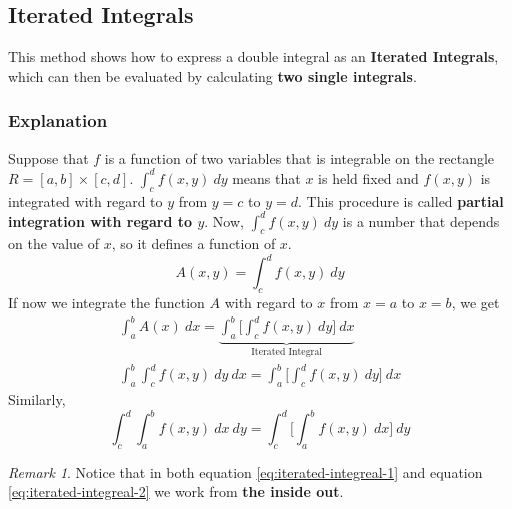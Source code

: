 \documentclass[math,code]{amznotes}
\theoremstyle{remark}
\newtheorem*{remark}{Remark}
\begin{document}
\subsection{Iterated Integrals}
This method shows how to express a double integral as an {\color{red} \textbf{Iterated Integrals}}, which can then be evaluated by calculating \textbf{two single integrals}.
\subsubsection{Explanation}
Suppose that $f$ is a function of two variables that is integrable on the rectangle $R=[a,b]\times[c,d]$. $\int_{c}^{d}f(x,y)~dy$ means that $x$ is held fixed and $f(x,y)$ is integrated with regard to $y$ from $y=c$ to $y=d$. This procedure is called {\color{red} \textbf{partial integration with regard to $y$}}. Now, $\int_{c}^{d}f(x,y)~dy$ is a number that depends on the value of $x$, so it defines a function of $x$.
\begin{displaymath}
    A(x,y)=\int_{c}^{d}f(x,y)~dy
\end{displaymath}
If now we integrate the function $A$ with regard to $x$ from $x=a$ to $x=b$, we get
\begin{gather}
    \int_a^bA(x)~dx=\underbrace{\int_a^b\Bigg[\int_c^df(x,y)~dy\Bigg]~dx}_\text{Iterated Integral} \\
    \int_a^b\int_c^df(x,y)~dy~dx = \int_a^b\Bigg[\int_c^df(x,y)~dy\Bigg]~dx \label{eq:iterated-integreal-1}
\end{gather}
Similarly,
\begin{equation} \label{eq:iterated-integreal-2}
    \int_c^d\int_a^bf(x,y)~dx~dy = \int_c^d\Bigg[\int_a^bf(x,y)~dx\Bigg]~dy
\end{equation}
\begin{notebox}
    \begin{remark}
        Notice that in both equation \eqref{eq:iterated-integreal-1} and equation \eqref{eq:iterated-integreal-2} we work from \textbf{the inside out}.
    \end{remark}
\end{notebox}
\end{document}
